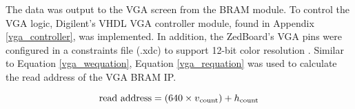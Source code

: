 \par
The data was output to the VGA screen from the BRAM module. To control the VGA logic, Digilent's VHDL VGA controller module, found in Appendix \ref{vga_controller}, was implemented. In addition, the ZedBoard's VGA pins were configured in a constraints file (.xdc) to support 12-bit color resolution \cite{zedboard_datasheet}. Similar to Equation \ref{vga_wequation}, Equation \ref{vga_requation} was used to calculate the read address of the VGA BRAM IP.

\begin{equation}
	\textrm{read address} = (640\times{}v\textsubscript{count})+ h\textsubscript{count}
	\label{vga_requation}
\end{equation}


